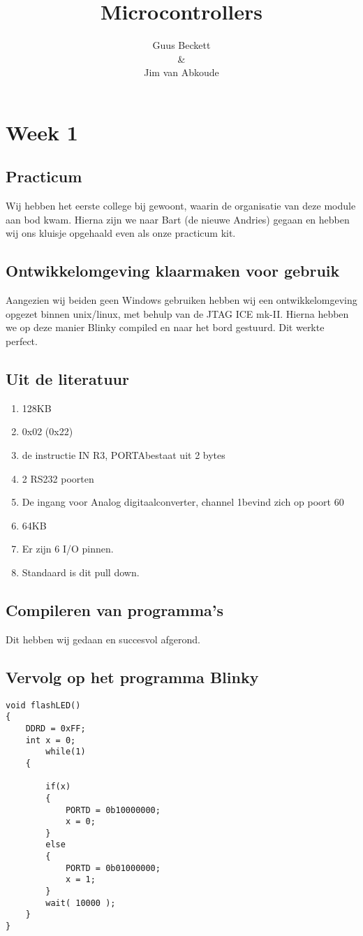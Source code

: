 \documentclass[10pt,a4paper]{report}
\author{Guus Beckett \\ \& \\ Jim van Abkoude}
\title{Microcontrollers}
\begin{document}
\maketitle
\tableofcontents
\chapter{Week 1}
\section{Practicum}
Wij hebben het eerste college bij gewoont, waarin de organisatie van deze module aan bod kwam. Hierna zijn we naar Bart (de nieuwe Andries) gegaan en hebben wij ons kluisje opgehaald even als onze \glqq practicum kit\grqq . 
\section{Ontwikkelomgeving klaarmaken voor gebruik}
Aangezien wij beiden geen Windows gebruiken hebben wij een ontwikkelomgeving opgezet binnen unix/linux, met behulp van de JTAG ICE mk-II. Hierna hebben we op deze manier Blinky compiled en naar het bord gestuurd. Dit werkte perfect.
\section{Uit de literatuur}
\begin{enumerate}
\item 128KB
\item 0x02 (0x22)
\item de instructie \glqq IN   R3, PORTA\grqq bestaat uit 2 bytes
\item 2 RS232 poorten
\item De \glqq ingang voor Analog digitaalconverter, channel 1\grqq bevind zich op poort 60
\item 64KB
\item Er zijn 6  I/O pinnen.
\item Standaard is dit pull down.
\end{enumerate}
\section{Compileren van programma's}
Dit hebben wij gedaan en succesvol afgerond. 
\section{Vervolg op het programma Blinky}
\begin{lstlisting}
void flashLED()
{
	DDRD = 0xFF; 
	int x = 0;
		while(1)
	{
		
		if(x)  
		{
			PORTD = 0b10000000;
			x = 0;
		}
		else
		{
			PORTD = 0b01000000;
			x = 1;
		}
		wait( 10000 );
	}
}
\end{lstlisting}
\end{document}
